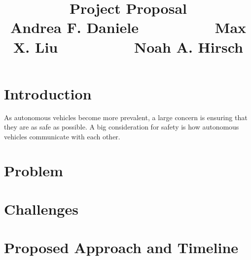 \documentclass{article}
\title{Project Proposal\vspace{-6pt}\\{\large Andrea F. Daniele $\hspace{2cm}$ Max X. Liu $\hspace{2cm}$ Noah A. Hirsch }}
\begin{document}
\maketitle


\vspace{-1.2cm}

\section*{Introduction}
\vspace{-.3cm}
As autonomous vehicles become more prevalent, a large concern is ensuring that they are as safe as possible. A big consideration for safety is how autonomous vehicles communicate with each other. 


\section*{Problem}
\vspace{-.3cm}

\section*{Challenges}
\vspace{-.3cm}

\section*{Proposed Approach and Timeline}
\vspace{-.3cm}




%
%
\end{document}
